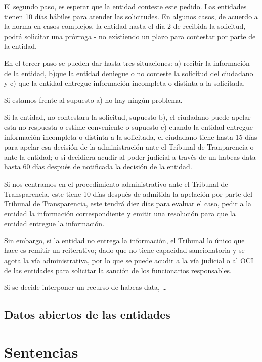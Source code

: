 \documentclass[
]{book}
\begin{document}
El segundo paso, es esperar que la entidad conteste este pedido. Las entidades tienen 10 días hábiles para atender las solicitudes. En algunos casos, de acuerdo a la norma en casos complejos, la entidad hasta el día 2 de recibida la solicitud, podrá solicitar una prórroga - no existiendo un plazo para contestar por parte de la entidad.

En el tercer paso se pueden dar hasta tres situaciones: a) recibir la información de la entidad, b)que la entidad deniegue o no conteste la solicitud del ciudadano y c) que la entidad entregue información incompleta o distinta a la solicitada.

Si estamos frente al supuesto a) no hay ningún problema.

Si la entidad, no contestara la solicitud, supuesto b), el ciudadano puede apelar esta no respuesta o estime conveniente o supuesto c) cuando la entidad entregue información incompleta o distinta a la solicitada, el ciudadano tiene hasta 15 días para apelar esa decisión de la administración ante el Tribunal de Tranparencia o ante la entidad; o si decidiera acudir al poder judicial a través de un habeas data hasta 60 días después de notificada la decisión de la entidad.

Si nos centramos en el procedimiento administrativo ante el Tribunal de Transparencia, este tiene 10 días después de admitida la apelación por parte del Tribunal de Transparencia, este tendrá diez días para evaluar el caso, pedir a la entidad la información correspondiente y emitir una resolución para que la entidad entregue la información.

Sin embargo, si la entidad no entrega la información, el Tribunal lo único que hace es remitir un reiterativo; dado que no tiene capacidad sancionatoria y se agota la vía administrativa, por lo que se puede acudir a la vía judicial o al OCI de las entidades para solicitar la sanción de los funcionarios responsables.

Si se decide interponer un recurso de habeas data, \ldots{}

\hypertarget{datos-abiertos-de-las-entidades}{%
\section{Datos abiertos de las entidades}\label{datos-abiertos-de-las-entidades}}

\hypertarget{sentencias}{%
\chapter{Sentencias}\label{sentencias}}
\end{document}
